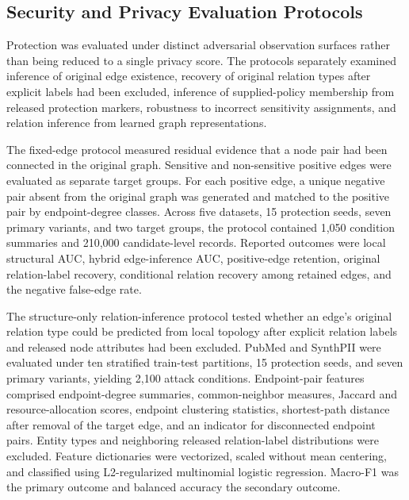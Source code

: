 \documentclass[preprint,12pt]{elsarticle}
\begin{document}
\subsection{Security and Privacy Evaluation Protocols}
Protection was evaluated under distinct adversarial observation surfaces rather than being reduced to a single privacy score. The protocols separately examined inference of original edge existence, recovery of original relation types after explicit labels had been excluded, inference of supplied-policy membership from released protection markers, robustness to incorrect sensitivity assignments, and relation inference from learned graph representations.

The fixed-edge protocol measured residual evidence that a node pair had been connected in the original graph. Sensitive and non-sensitive positive edges were evaluated as separate target groups. For each positive edge, a unique negative pair absent from the original graph was generated and matched to the positive pair by endpoint-degree classes. Across five datasets, 15 protection seeds, seven primary variants, and two target groups, the protocol contained 1,050 condition summaries and 210,000 candidate-level records. Reported outcomes were local structural AUC, hybrid edge-inference AUC, positive-edge retention, original relation-label recovery, conditional relation recovery among retained edges, and the negative false-edge rate.

The structure-only relation-inference protocol tested whether an edge's original relation type could be predicted from local topology after explicit relation labels and released node attributes had been excluded. PubMed and SynthPII were evaluated under ten stratified train-test partitions, 15 protection seeds, and seven primary variants, yielding 2,100 attack conditions. Endpoint-pair features comprised endpoint-degree summaries, common-neighbor measures, Jaccard and resource-allocation scores, endpoint clustering statistics, shortest-path distance after removal of the target edge, and an indicator for disconnected endpoint pairs. Entity types and neighboring released relation-label distributions were excluded. Feature dictionaries were vectorized, scaled without mean centering, and classified using L2-regularized multinomial logistic regression. Macro-F1 was the primary outcome and balanced accuracy the secondary outcome.
\end{document}
